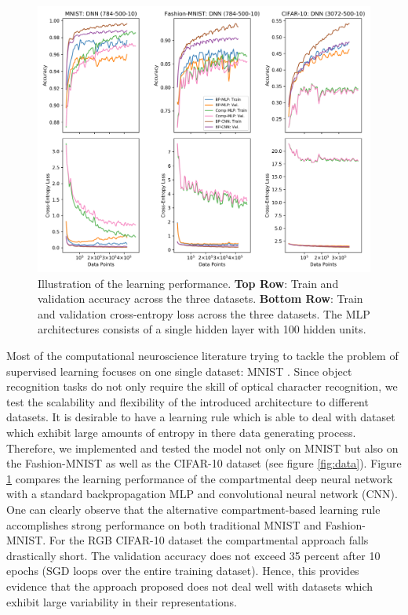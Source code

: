 \documentclass[colorinlistoftodos]{article}
\theoremstyle{definition}
\begin{document}
\begin{figure}[H]
	\centering
	\includegraphics[width=\textwidth]{../figures/learning}
	\caption{Illustration of the learning performance. \textbf{Top Row}: Train and validation accuracy across the three datasets. \textbf{Bottom Row}: Train and validation cross-entropy loss across the three datasets. The MLP architectures consists of a single hidden layer with 100 hidden units.} \label{fig:performance}
\end{figure}

Most of the computational neuroscience literature trying to tackle the problem of supervised learning focuses on one single dataset: MNIST \cite{lecun_1998}. Since object recognition tasks do not only require the skill of optical character recognition, we test the scalability and flexibility of the introduced architecture to different datasets. It is desirable to have a learning rule which is able to deal with dataset which exhibit large amounts of entropy in there data generating process. Therefore, we implemented and tested the \citet{guerguiev2017} model not only on MNIST but also on the Fashion-MNIST \citep{xiao_2017} as well as the CIFAR-10 \citep{torralba_2008} dataset (see figure \ref{fig:data}). Figure \ref{fig:performance} compares the learning performance of the compartmental deep neural network with a standard backpropagation MLP and convolutional neural network (CNN). One can clearly observe that the alternative compartment-based learning rule accomplishes strong performance on both traditional MNIST and Fashion-MNIST. For the RGB CIFAR-10 dataset the compartmental approach falls drastically short. The validation accuracy does not exceed 35 percent after 10 epochs (SGD loops over the entire training dataset).
Hence, this provides evidence that the approach proposed does not deal well with datasets which exhibit large variability in their representations.
\end{document}

